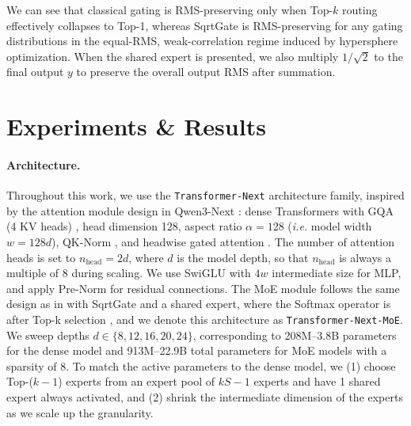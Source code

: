 \documentclass{article}
\begin{document}
We can see that classical gating is RMS-preserving only when Top-$k$ routing effectively collapses to Top-1, whereas SqrtGate is RMS-preserving for any gating distributions in the equal-RMS, weak-correlation regime induced by hypersphere optimization.  When the shared expert is presented, we also multiply $1/\sqrt{2}$ to the final output $y$ to preserve the overall output RMS after summation.




\section{Experiments \& Results}\label{sec:experiments}

\paragraph{Architecture.} Throughout this work, we use the \texttt{Transformer-Next} architecture family, inspired by the attention module design in Qwen3-Next \cite{qwen2025qwen3next80ba3b}: dense Transformers with GQA (4 KV heads) \cite{ainslie2023gqa}, head dimension 128, aspect ratio $\alpha =128$ (\emph{i.e.} model width $w = 128d$), QK-Norm \cite{pmlr-v202-dehghani23a}, and headwise gated attention \cite{qiu2025gated}. The number of attention heads is set to $n_{\mathrm{head}} = 2d$, where $d$ is the model depth, so that $n_{\mathrm{head}} $ is always a multiple of 8 during scaling. We use SwiGLU \cite{shazeer2020glu} with $4w$ intermediate size  \cite{ren2025decoderhybriddecoder,openai2025gpt0oss0120b} for MLP, and apply Pre-Norm \cite{prenorm} for residual connections. The MoE module follows the same design as in  with SqrtGate and a shared expert, where the Softmax operator is after Top-k selection \cite{openai2025gpt0oss0120b}, and we denote this architecture as \texttt{Transformer-Next-MoE}. We sweep depths $d \in \{8, 12, 16, 20, 24\}$, corresponding to 208M--3.8B parameters for the dense model and 913M--22.9B total parameters for MoE models with a sparsity of 8.
To match the active parameters to the dense model, we (1) choose Top-($k-1$) experts from an expert pool of $kS-1$ experts and have 1 shared expert always activated, and (2) shrink the intermediate dimension of the experts as we scale up the granularity.
\end{document}
